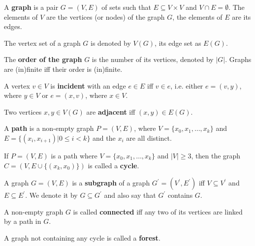 \begin{definition}
  A {\bf graph} is a pair $G = (V,E)$ of sets such that $E\subseteq V\times V$ and $V\cap E = \emptyset$. The elements of $V$ are the vertices (or nodes) of the graph $G$, the elements of $E$ are its edges.
\end{definition}

The vertex set of a graph $G$ is denoted by $V(G)$, its edge set as $E(G)$.

\begin{definition}
  The {\bf order of the graph} $G$ is the number of its vertices, denoted by $|G|$. Graphs are (in)finite iff their order is (in)finite.
\end{definition}

\begin{definition}
  A vertex $v\in V$ is {\bf incident} with an edge $e\in E$ iff $v\in e$, i.e. either $e=(v,y)$, where $y\in V$ or $e=(x,v)$, where $x\in V$.
\end{definition}

\begin{definition}
  Two vertices $x,y\in V(G)$ are {\bf adjacent} iff $(x,y)\in E(G)$.
\end{definition}

\begin{definition}
  A {\bf path} is a non-empty graph $P=(V,E)$, where $V=\{x_0, x_1, \ldots, x_k\}$ and $E=\{(x_i,x_{i+1})|0\leq i < k\}$ and the $x_i$ are all distinct.
\end{definition}

\begin{definition}
  If $P=(V,E)$ is a path where $V=\{x_0, x_1, \ldots, x_k\}$ and $|V|\geq 3$, then the graph $C = (V,E\cup\{(x_k,x_0)\})$ is called a {\bf cycle}. 
\end{definition}

\begin{definition}
  A graph $G=(V,E)$ is a {\bf subgraph} of a graph $G^\prime = (V^\prime, E^\prime)$ iff $V\subseteq V^\prime$ and $E\subseteq E^\prime$. We denote it by $G\subseteq G^\prime$ and also say that $G^\prime$ contains $G$.
\end{definition}

\begin{definition}
  A non-empty graph $G$ is called {\bf connected} iff any two of its vertices are linked by a path in $G$.
\end{definition}

\begin{definition}
  A graph not containing any cycle is called a {\bf forest}.
\end{definition}

